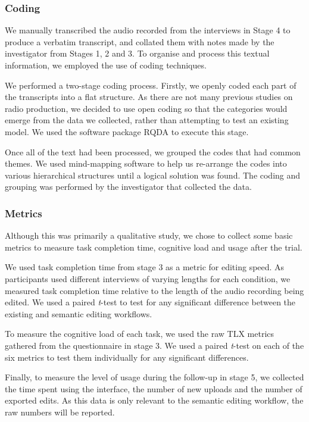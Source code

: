 \subsubsection{Coding}
We manually transcribed the audio recorded from the interviews in Stage 4 to produce a verbatim transcript, and
collated them with notes made by the investigator from Stages 1, 2 and 3. To organise and process this textual
information, we employed the use of coding techniques.

We performed a two-stage coding process.  Firstly, we openly coded each part of the transcripts into a flat structure.
As there are not many previous studies on radio production, we decided to use open coding so that the categories would
emerge from the data we collected, rather than attempting to test an existing model.  We used the software package RQDA
\citep{RQDA} to execute this stage.

Once all of the text had been processed, we grouped the codes that had common themes. We used mind-mapping software to
help us re-arrange the codes into various hierarchical structures until a logical solution was found.  The coding
and grouping was performed by the investigator that collected the data.

\subsubsection{Metrics}
Although this was primarily a qualitative study, we chose to collect some basic metrics to measure task completion
time, cognitive load and usage after the trial.

We used task completion time from stage 3 as a metric for editing speed. As participants used different interviews of
varying lengths for each condition, we measured task completion time relative to the length of the audio
recording being edited. We used a paired \textit{t}-test to test for any significant difference between the existing
and semantic editing workflows.

To measure the cognitive load of each task, we used the raw TLX metrics gathered from the questionnaire in stage 3. We
used a paired \textit{t}-test on each of the six metrics to test them individually for any significant differences.

Finally, to measure the level of usage during the follow-up in stage 5, we collected the time spent using the
interface, the number of new uploads and the number of exported edits. As this data is only relevant to the semantic
editing workflow, the raw numbers will be reported.

